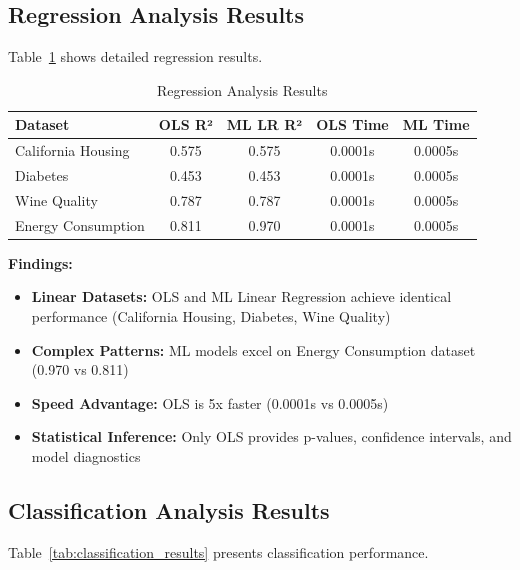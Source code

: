 \documentclass[11pt,a4paper]{article}
\begin{document}
\subsection{Regression Analysis Results}

Table~\ref{tab:regression_results} shows detailed regression results.

\begin{table}[h]
\centering
\begin{tabular}{lcccc}
\toprule
\textbf{Dataset} & \textbf{OLS R²} & \textbf{ML LR R²} & \textbf{OLS Time} & \textbf{ML Time} \\
\midrule
California Housing & 0.575 & 0.575 & 0.0001s & 0.0005s \\
Diabetes & 0.453 & 0.453 & 0.0001s & 0.0005s \\
Wine Quality & 0.787 & 0.787 & 0.0001s & 0.0005s \\
Energy Consumption & 0.811 & \textcolor{mlcolor}{0.970} & 0.0001s & 0.0005s \\
\bottomrule
\end{tabular}
\caption{Regression Analysis Results}
\label{tab:regression_results}
\end{table}

\textbf{Findings:}
\begin{itemize}
    \item \textbf{Linear Datasets:} OLS and ML Linear Regression achieve identical performance (California Housing, Diabetes, Wine Quality)
    \item \textbf{Complex Patterns:} ML models excel on Energy Consumption dataset (0.970 vs 0.811)
    \item \textbf{Speed Advantage:} OLS is 5x faster (0.0001s vs 0.0005s)
    \item \textbf{Statistical Inference:} Only OLS provides p-values, confidence intervals, and model diagnostics
\end{itemize}

\subsection{Classification Analysis Results}

Table~\ref{tab:classification_results} presents classification performance.
\end{document}
